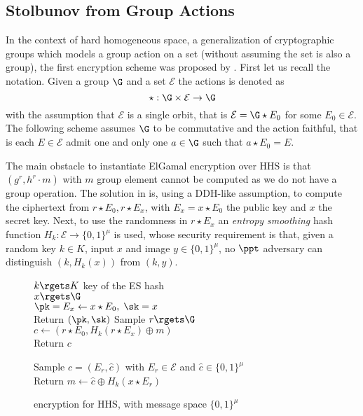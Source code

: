 \subsection{Stolbunov from Group Actions}

In the context of hard homogeneous space, a generalization of cryptographic groups which models a group action on a set (without assuming the set is also a group), the first encryption scheme was proposed by \cite{OTHER:Stolbunov10}.
First let us recall the notation.
Given a group $\G$ and a set $\mathcal{E}$ the actions is denoted as
\[
	\star : \G \times \mathcal{E} \to \G
\]
with the assumption that $\mathcal{E}$ is a single orbit, that is $\mathcal{E} = \G \star E_0$ for some $E_0 \in \mathcal{E}$.
The following scheme assumes $\G$ to be commutative and the action faithful, that is each $E \in \mathcal{E}$ admit one and only one $a \in \G$ such that $a \star E_0 = E$.

The main obstacle to instantiate ElGamal encryption over HHS is that $(g^r, h^r \cdot m)$ with $m$ group element cannot be computed as we do not have a group operation.
The solution in \cite{OTHER:Stolbunov10} is, using a DDH-like assumption, to compute the ciphertext from $r \star E_0, r \star E_x$, with $E_x = x \star E_0$ the public key and $x$ the secret key.
Next, to use the randomness in $r \star E_x$ an \textit{entropy smoothing} hash function $H_k : \mathcal{E} \to \{0, 1\}^\mu$ is used, whose security requirement is that, given a random key $k \in K$, input $x$ and image $y \in \{0, 1\}^\mu$, no $\ppt$ adversary can distinguish $(k, H_k(x))$ from $(k, y)$.


\begin{figure}[htb]
\centering
\begin{pcvstack}[center, space = 6pt]
\begin{pchstack}[center, space=12pt]
		{
			$k \rgets K$ key of the ES hash
				\\
			$x \rgets \G$
				\\
			$\pk = E_x \gets x \star E_0, \; \sk = x$
				\\
			Return $(\pk, \sk)$
		}
		{
			Sample $r \rgets \G$
				\\
			$c \gets (r \star E_0, H_k(r \star E_x) \oplus m)$
				\\
			Return $c$
		}
\end{pchstack}
\begin{pchstack}[center]
		{
			Sample $c = (E_r, \hat{c})$ with $E_r \in \mathcal{E}$ and $\hat{c} \in \{0, 1\}^\mu$
				\\
			Return $m \gets \hat{c} \oplus H_k(x \star E_r)$
		}
\end{pchstack}
\end{pcvstack}
\label{prot:Stolbunov10}
\caption{\cite{OTHER:Stolbunov10} encryption for HHS, with message space $\{0, 1\}^\mu$}
\end{figure}

